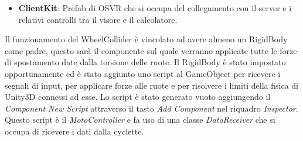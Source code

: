 \begin{itemize}
\begin{itemize}
\begin{itemize}
					\end{itemize}
			\item \textbf{Camera}: oggetto contenente due oggetti camera.   		\begin{itemize}
  						\item \textit{TestCamera}: camera solitamente disattivata. Utilizzata solamente in test senza il visore.
			  			\item \textit{VRDisplayTracked}: il Prefab\footnote{Oggetto prefabbricato di Unity, pronto per essere importato} del visore che sostituisce un normale oggetto camera. Questo oggetto camera permettere di essere ruotata tramite i movimenti del visore.
					\end{itemize}
		\end{itemize}
	\item \textbf{ClientKit}: Prefab di OSVR che si occupa del collegamento con il server e i relativi controlli tra il visore e il calcolatore.

\end{itemize}


\noindent Il funzionamento del WheelCollider è vincolato ad avere almeno un RigidBody come padre, questo sarà il componente sul quale verranno applicate tutte le forze di spostamento date dalla torsione delle ruote. Il RigidBody è stato impostato opportunamente ed è stato aggiunto uno script al GameObject per ricevere i segnali di input, per applicare forze alle ruote e per risolvere i limiti della fisica di Unity3D connessi ad esse. Lo script è stato generato vuoto aggiungendo il \textit{Component New Script} attraverso il tasto \textit{Add Component} nel riquadro \textit{Inspector}. Questo script è il \textit{MotoController} e fa uso di una classe \textit{DataReceiver} che si occupa di ricevere i dati dalla cyclette.

\newpage
